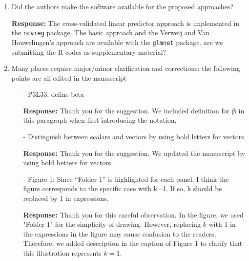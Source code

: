 \documentclass[12]{article}
\newcommand{\re}{\textbf{Response: }}
\newcommand\bd[1]{{\color{blue}#1}}
\newcommand{\bbeta}{\boldsymbol{\beta}}
\begin{document}
\begin{enumerate}[align = left]
\begin{enumerate}
    \item Table 2 - Why only present the number of true positives here? I suggest presenting other operating characteristics such as TPR, NPR, PPV, etc... Then the results might help better justify the findings from the application. For example, depending on the results, referring to the simulation results could strengthen the argument given at the end of the second paragraph in Discussion (which is quite speculative in my opinion).
    
    \re \bd{one argument would be we are evaluting the predictive performance. This comment can be addressed jointly with Reviewer 1's comment 8}
    
\end{enumerate}

\item Did the authors make the software available for the proposed approaches?

\re The cross-validated linear predictor approach is implemented in the \texttt{ncvreg} package. The basic approach and the Verweij and Van Houwelingen's approach are available with the \texttt{glmnet} package. \bd{are we submitting the R codes as supplementary material?}

\item Many places require major/minor clarification and corrections:
\bd{the following points are all edited in the manuscript}
\begin{itemize}[align = left]
\item[-]  P3L33: define beta

\re Thank you for the suggestion. We included definition for $\bbeta$ in this paragraph when first introducing the notation.

\item[-] Distinguish between scalars and vectors by using bold letters for vectors

\re Thank you for the suggestion. We updated the manuscript by using bold betters for vectors.

\item[-] Figure 1: Since “Folder 1” is highlighted for each panel, I think the figure corresponds to the specific case with k=1. If so, k should be replaced by 1 in expressions.

\re Thank you for this careful observation. In the figure, we used "Folder 1" for the simplicity of drawing. However, replacing $k$ with $1$ in the expressions in the figure may cause confusion to the readers. Therefore, we added description in the caption of Figure 1 to clarify that this illustration represents $k = 1$.


\end{itemize}
\end{enumerate}
\end{document}
